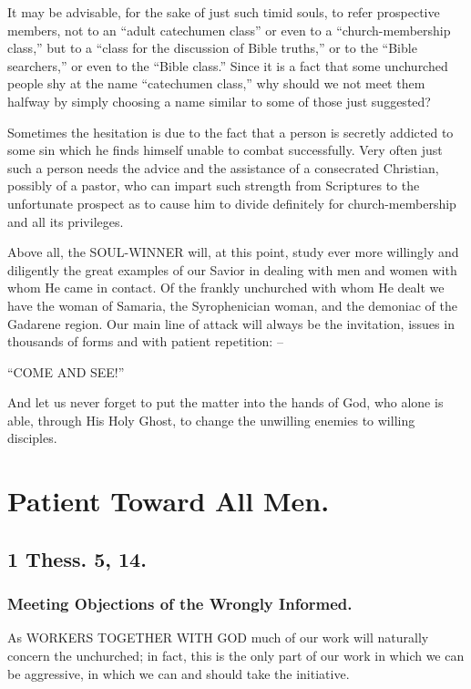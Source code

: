 \documentclass[
]{book}
\begin{document}
It may be advisable, for the sake of just such timid souls, to refer prospective members, not to an ``adult catechumen class'' or even to a ``church-membership class,'' but to a ``class for the discussion of Bible truths,'' or to the ``Bible searchers,'' or even to the ``Bible class.'' Since it is a fact that some unchurched people shy at the name ``catechumen class,'' why should we not meet them halfway by simply choosing a name similar to some of those just suggested?

Sometimes the hesitation is due to the fact that a person is secretly addicted to some sin which he finds himself unable to combat successfully. Very often just such a person needs the advice and the assistance of a consecrated Christian, possibly of a pastor, who can impart such strength from Scriptures to the unfortunate prospect as to cause him to divide definitely for church-membership and all its privileges.

Above all, the SOUL-WINNER will, at this point, study ever more willingly and diligently the great examples of our Savior in dealing with men and women with whom He came in contact. Of the frankly unchurched with whom He dealt we have the woman of Samaria, the Syrophenician woman, and the demoniac of the Gadarene region. Our main line of attack will always be the invitation, issues in thousands of forms and with patient repetition: --

``COME AND SEE!''

And let us never forget to put the matter into the hands of God, who alone is able, through His Holy Ghost, to change the unwilling enemies to willing disciples.

\chapter{Patient Toward All Men.}\label{patient-toward-all-men.}

\section*{1 Thess. 5, 14.}\label{thess.-5-14.}

\subsection*{Meeting Objections of the Wrongly Informed.}\label{meeting-objections-of-the-wrongly-informed.}

As WORKERS TOGETHER WITH GOD much of our work will naturally concern the unchurched; in fact, this is the only part of our work in which we can be aggressive, in which we can and should take the initiative.
\end{document}
